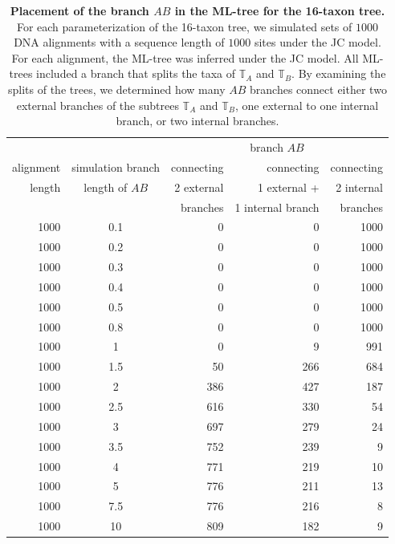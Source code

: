 \begin{appendices}
\begin{table}[hb]
    \centering
    \begin{tabular}{|r|c|r|r|r|}
\hline
 &  &\multicolumn{3}{c|}{branch $AB$}\\
alignment &simulation branch&   connecting  & connecting &  connecting\\
length &length of $AB$ &     2 external & 1 external +  & 2 internal \\
&&     branches & 1 internal branch & branches\\
\hline
1000	&0.1	&  0	& 0  & 1000 \\
1000	&0.2	&  0	& 0  & 1000 \\
1000	&0.3	&  0	& 0  & 1000 \\
1000	&0.4	&  0	& 0  & 1000 \\
1000	&0.5	&  0	& 0  & 1000 \\
1000	&0.8	&  0   	& 0  & 1000 \\
1000	&1   	& 0	    & 9  & 991 \\
1000	&1.5	&50	    &266 & 684 \\
1000	&2  	&386	&427 &187 \\
1000	&2.5	&616	&330 &54 \\
1000	&3  	&697	&279 &24 \\
1000	&3.5	&752	&239 & 9 \\
1000	&4      &771	&219 &10\\
1000	&5  	&776	&211 &13 \\
1000	&7.5	&776	&216 &8 \\
1000	&10 	&809	&182 &9 \\
\hline
    \end{tabular}
    \vspace{0.25cm}
    \caption{
        \textbf{Placement of the  branch $AB$ in the ML-tree for the 16-taxon tree.}
        For each parameterization of the 16-taxon tree, we simulated sets of $1000$ DNA alignments with a sequence length of $1000$ sites under the JC model. For each alignment, the ML-tree was inferred under the JC model. All ML-trees included a branch that splits the taxa of $\mathbb{T}_A$ and $\mathbb{T}_B$. By examining the splits of the trees, we determined how many $AB$ branches connect either two external branches of the subtrees $\mathbb{T}_A$ and $\mathbb{T}_B$, one external to one internal branch, or two internal branches.
   }
    \label{supptab:bonferroni_correction_1000}
    \end{table}\hfill\\


\end{appendices}
